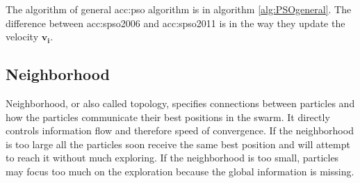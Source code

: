 The algorithm of general \acrshort{acc:pso} algorithm is in algorithm \ref{alg:PSOgeneral}. The difference between \acrshort{acc:spso2006} and \acrshort{acc:spso2011} is in the way they update the velocity $\mathbf{v_i}$.

\subsection{Neighborhood}
\label{chap:psoneig}

Neighborhood, or also called topology, specifies connections between particles and how the particles communicate their best positions in the swarm. It directly controls information flow and therefore speed of convergence. If the neighborhood is too large all the particles soon receive the same best position and will attempt to reach it without much exploring. If the neighborhood is too small, particles may focus too much on the exploration because the global information is missing.

